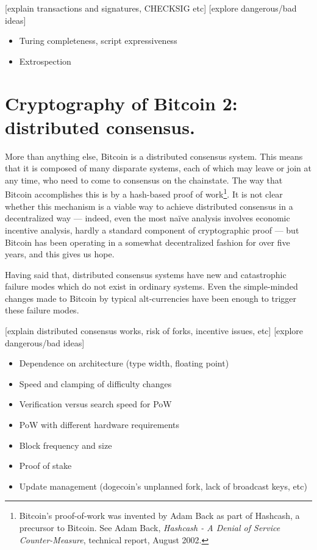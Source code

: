 \documentclass[letterpaper]{article}
\begin{document}
[explain transactions and signatures, CHECKSIG etc]
[explore dangerous/bad ideas]
\begin{itemize}
\item Turing completeness, script expressiveness
\item Extrospection
\end{itemize}

\section{Cryptography of Bitcoin 2: distributed consensus.\label{consensus}}

More than anything else, Bitcoin is a distributed consensus system. This
means that it is composed of many disparate systems, each of which may
leave or join at any time, who need to come to consensus on the chainstate.
The way that Bitcoin accomplishes this is by a hash-based proof of
work\footnote{Bitcoin's proof-of-work was invented by Adam Back as part
of Hashcash, a precursor to Bitcoin. See Adam Back, \emph{Hashcash - A Denial
of Service Counter-Measure}, technical report, August 2002.}. It is not
clear whether this mechanism is a viable way to achieve distributed consensus
in a decentralized way --- indeed, even the most na\"ive analysis involves
economic incentive analysis, hardly a standard component of cryptographic
proof --- but Bitcoin has been operating in a somewhat decentralized
fashion for over five years, and this gives us hope.

Having said that, distributed consensus systems have new and catastrophic
failure modes which do not exist in ordinary systems. Even the simple-minded
changes made to Bitcoin by typical alt-currencies have been enough to
trigger these failure modes.

[explain distributed consensus works, risk of forks, incentive issues, etc]
[explore dangerous/bad ideas]
\begin{itemize}
\item Dependence on architecture (type width, floating point)
\item Speed and clamping of difficulty changes
\item Verification versus search speed for PoW
\item PoW with different hardware requirements
\item Block frequency and size
\item Proof of stake
\item Update management (dogecoin's unplanned fork, lack of broadcast keys, etc)
\end{itemize}
\end{document}
